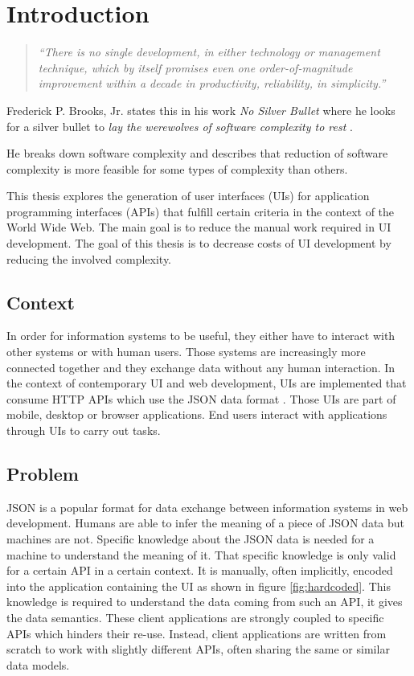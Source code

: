 \section{Introduction}\label{introduction}

\begin{quotation}
\textit{``There is no single development, in either technology or management technique, which by itself promises even one order-of-magnitude improvement within a decade in productivity, reliability, in simplicity.''} \citep[p.~1]{nosilverbullet}
\end{quotation}

Frederick P. Brooks, Jr. states this in his work \textit{No Silver Bullet} where he looks for a silver bullet to \textit{lay the werewolves of software complexity to rest} \citep[p.~1]{nosilverbullet}.

He breaks down software complexity and describes that reduction of software complexity is more feasible for some types of complexity than others.

This thesis explores the generation of user interfaces (UIs) for application programming interfaces (APIs) that fulfill certain criteria in the context of the World Wide Web. The main goal is to reduce the manual work required in UI development. The goal of this thesis is to decrease costs of UI development by reducing the involved complexity.

\subsection{Context}\label{context}
In order for information systems to be useful, they either have to interact with other systems or with human users. Those systems are increasingly more connected together and they exchange data without any human interaction. In the context of contemporary UI and web development, UIs are implemented that consume HTTP APIs which use the JSON data format \citep{jsonformat}. Those UIs are part of mobile, desktop or browser applications. End users interact with applications through UIs to carry out tasks.

\subsection{Problem}\label{problem}
JSON is a popular format for data exchange between information systems in web development. Humans are able to infer the meaning of a piece of JSON data but machines are not. Specific knowledge about the JSON data is needed for a machine to understand the meaning of it. That specific knowledge is only valid for a certain API in a certain context. It is manually, often implicitly, encoded into the application containing the UI as shown in figure \ref{fig:hardcoded}. This knowledge is required to understand the data coming from such an API, it gives the data semantics. These client applications are strongly coupled to specific APIs which hinders their re-use. Instead, client applications are written from scratch to work with slightly different APIs, often sharing the same or similar data models.

